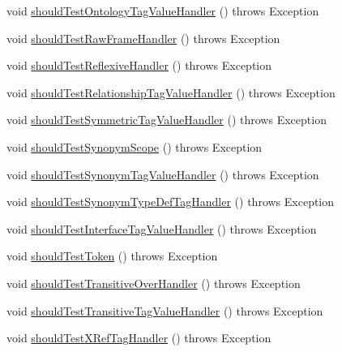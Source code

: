\begin{DoxyCompactItemize}
\item 
void \hyperlink{classorg_1_1semanticweb_1_1owlapi_1_1contract_1_1_contract_obo_parser_test_a393e669a13448d8c8532df038fc072fa}{should\-Test\-Ontology\-Tag\-Value\-Handler} ()  throws Exception 
\item 
void \hyperlink{classorg_1_1semanticweb_1_1owlapi_1_1contract_1_1_contract_obo_parser_test_a3bb19692b8f0b66662512898d447b497}{should\-Test\-Raw\-Frame\-Handler} ()  throws Exception 
\item 
void \hyperlink{classorg_1_1semanticweb_1_1owlapi_1_1contract_1_1_contract_obo_parser_test_acb344a317ea2011eb27807465494e206}{should\-Test\-Reflexive\-Handler} ()  throws Exception 
\item 
void \hyperlink{classorg_1_1semanticweb_1_1owlapi_1_1contract_1_1_contract_obo_parser_test_a62c3d37d58782d4e30eb5aaff075adc6}{should\-Test\-Relationship\-Tag\-Value\-Handler} ()  throws Exception 
\item 
void \hyperlink{classorg_1_1semanticweb_1_1owlapi_1_1contract_1_1_contract_obo_parser_test_ae4d06096cb00211693d3185dff85def2}{should\-Test\-Symmetric\-Tag\-Value\-Handler} ()  throws Exception 
\item 
void \hyperlink{classorg_1_1semanticweb_1_1owlapi_1_1contract_1_1_contract_obo_parser_test_adac9f7b8db1b51980faf594c60d41c00}{should\-Test\-Synonym\-Scope} ()  throws Exception 
\item 
void \hyperlink{classorg_1_1semanticweb_1_1owlapi_1_1contract_1_1_contract_obo_parser_test_acca3450e3d83068072a18a71b4fbe532}{should\-Test\-Synonym\-Tag\-Value\-Handler} ()  throws Exception 
\item 
void \hyperlink{classorg_1_1semanticweb_1_1owlapi_1_1contract_1_1_contract_obo_parser_test_aa1d3f70a2bbb455f519d24af21a7fbf6}{should\-Test\-Synonym\-Type\-Def\-Tag\-Handler} ()  throws Exception 
\item 
void \hyperlink{classorg_1_1semanticweb_1_1owlapi_1_1contract_1_1_contract_obo_parser_test_a216affd5e91ce9b1d2777e635157f4b6}{should\-Test\-Interface\-Tag\-Value\-Handler} ()  throws Exception 
\item 
void \hyperlink{classorg_1_1semanticweb_1_1owlapi_1_1contract_1_1_contract_obo_parser_test_a4f32c516a43955f4718d323eb968f804}{should\-Test\-Token} ()  throws Exception 
\item 
void \hyperlink{classorg_1_1semanticweb_1_1owlapi_1_1contract_1_1_contract_obo_parser_test_a8bbd1391b119dfe3fd610f1d1e699c11}{should\-Test\-Transitive\-Over\-Handler} ()  throws Exception 
\item 
void \hyperlink{classorg_1_1semanticweb_1_1owlapi_1_1contract_1_1_contract_obo_parser_test_a9c6b9c880a9ac63e6488c3075854be2b}{should\-Test\-Transitive\-Tag\-Value\-Handler} ()  throws Exception 
\item 
void \hyperlink{classorg_1_1semanticweb_1_1owlapi_1_1contract_1_1_contract_obo_parser_test_a6e2c6b1ba2bb4ae79d0227fbc7d9f79f}{should\-Test\-X\-Ref\-Tag\-Handler} ()  throws Exception 
\end{DoxyCompactItemize}
